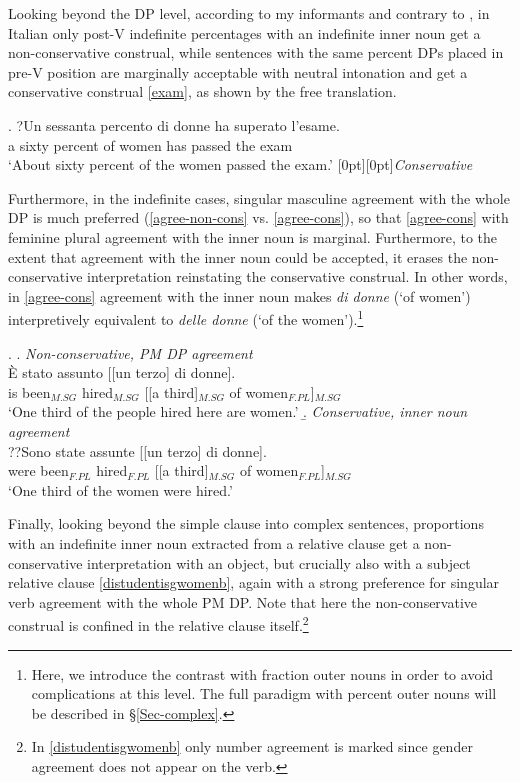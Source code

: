 \documentclass[charis, linguex]{glossa}
\newcommand{\rcommentg}[1]{\hfill\raisebox{1.9\baselineskip}[0pt][0pt]{#1}}
\begin{document}
Looking beyond the DP level, according to my informants and contrary to \citet[ex.44]{ahn17}, in Italian only post-V indefinite percentages with an indefinite inner noun get a non-conservative construal, while sentences with the same percent DPs placed in pre-V position are  marginally acceptable with neutral intonation and get a conservative construal \ref{exam}, as shown by the free translation.

\exg. ?Un sessanta percento di donne ha superato l'esame. \\
      a sixty percent of women has passed {the exam}\\ \label{exam}
   \glt    `About sixty percent of the women passed the exam.'  \rcommentg{\textit{Conservative}}
   

Furthermore, in the indefinite cases, singular masculine agreement with the whole DP is much preferred (\ref{agree-non-cons} vs. \ref{agree-cons}), so that \ref{agree-cons} with feminine plural agreement with the inner noun is marginal. Furthermore, to the extent that agreement with the inner noun could be accepted, it erases the non-conservative interpretation reinstating the conservative construal. In other words, in \ref{agree-cons} agreement with the inner noun makes \textit{di donne} (`of women') interpretively equivalent to \textit{delle donne} (`of the women').\footnote{Here, we introduce  the contrast with fraction outer nouns in order to avoid complications at this level. The full paradigm with percent outer nouns will be described in \S\ref{Sec-complex}.}


\ex. \a. \textit{Non-conservative, PM DP agreement} \\
    \gll \`{E} stato assunto [[un terzo] di donne]. \\
      is been$_{M.SG}$ hired$_{M.SG}$ [[a third]$_{M.SG}$ of women$_{F.PL}$]$_{M.SG}$ \\
	  \glt `One third of the people hired here are women.' \label{agree-non-cons} 
	  \b. \textit{Conservative, inner noun agreement} \\
	  \gll ??Sono state assunte [[un terzo] di donne]. \\
	        were been$_{F.PL}$ hired$_{F.PL}$ [[a third]$_{M.SG}$ of women$_{F.PL}$]$_{M.SG}$  \\
	  	  \glt `One third of the women were hired.' \label{agree-cons} 


Finally, looking beyond the simple clause into complex sentences, proportions
with an indefinite inner noun extracted from a relative clause get a
non-conservative interpretation with an object, but crucially also with a
subject relative clause \ref{distudentisgwomenb}, again with a strong
preference for singular verb agreement with the whole PM DP. Note that here the
non-conservative construal is confined in the relative clause
itself.\footnote{In \ref{distudentisgwomenb} only number agreement is marked
since gender agreement does not appear on the verb.}
	
\end{document}
